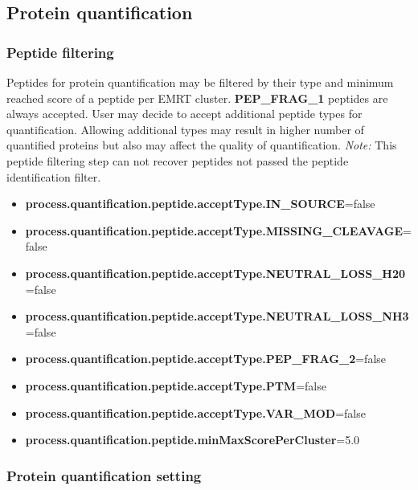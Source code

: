 \documentclass[]{article}
\providecommand{\tightlist}{%
  \setlength{\itemsep}{0pt}\setlength{\parskip}{0pt}}
\begin{document}
\subsection{Protein quantification}\label{protein-quantification}

\subsubsection{Peptide filtering}\label{peptide-filtering}

Peptides for protein quantification may be filtered by their type and
minimum reached score of a peptide per EMRT cluster.
\textbf{PEP\_FRAG\_1} peptides are always accepted. User may decide to
accept additional peptide types for quantification. Allowing additional
types may result in higher number of quantified proteins but also may
affect the quality of quantification. \emph{Note:} This peptide
filtering step can not recover peptides not passed the peptide
identification filter.

\begin{itemize}
\tightlist
\item
  \textbf{process.quantification.peptide.acceptType.IN\_SOURCE}=false
\item
  \textbf{process.quantification.peptide.acceptType.MISSING\_CLEAVAGE}=false
\item
  \textbf{process.quantification.peptide.acceptType.NEUTRAL\_LOSS\_H20}=false
\item
  \textbf{process.quantification.peptide.acceptType.NEUTRAL\_LOSS\_NH3}=false
\item
  \textbf{process.quantification.peptide.acceptType.PEP\_FRAG\_2}=false
\item
  \textbf{process.quantification.peptide.acceptType.PTM}=false
\item
  \textbf{process.quantification.peptide.acceptType.VAR\_MOD}=false
\item
  \textbf{process.quantification.peptide.minMaxScorePerCluster}=5.0
\end{itemize}

\subsubsection{Protein quantification
setting}\label{protein-quantification-setting}
\end{document}
